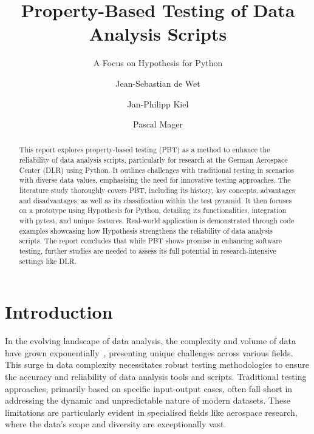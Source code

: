 \documentclass[runningheads]{llncs}
\begin{document}
%
\title{Property-Based Testing of Data Analysis Scripts}
\subtitle{A Focus on Hypothesis for Python}
%
%
\author{Jean-Sebastian de Wet \and
  Jan-Philipp Kiel \and
  Pascal Mager}
%
%
%
\maketitle              %
%
\begin{abstract}
  This report explores property-based testing (PBT) as a meth\-od to enhance the reliability of data analysis scripts, particularly for research at the German Aerospace Center (DLR) using Python. It outlines challenges with traditional testing in scenarios with diverse data values, emphasising the need for innovative testing approaches. The literature study thoroughly covers PBT, including its history, key concepts, advantages and disadvantages, as well as its classification within the test pyramid. It then focuses on a prototype using Hypothesis for Python, detailing its functionalities, integration with pytest, and unique features. Real-world application is demonstrated through code examples showcasing how Hypothesis strengthens the reliability of data analysis scripts. The report concludes that while PBT shows promise in enhancing software testing, further studies are needed to assess its full potential in research-intensive settings like DLR.

\end{abstract}
%
%
%
\section{Introduction}
In the evolving landscape of data analysis, the complexity and volume of data have grown exponentially~\cite{Taylor2023}, presenting unique challenges across various fields. This surge in data complexity necessitates robust testing methodologies to ensure the accuracy and reliability of data analysis tools and scripts. Traditional testing approaches, primarily based on specific input-output cases, often fall short in addressing the dynamic and unpredictable nature of modern datasets. These limitations are particularly evident in specialised fields like aerospace research, where the data's scope and diversity are exceptionally vast.
\end{document}

